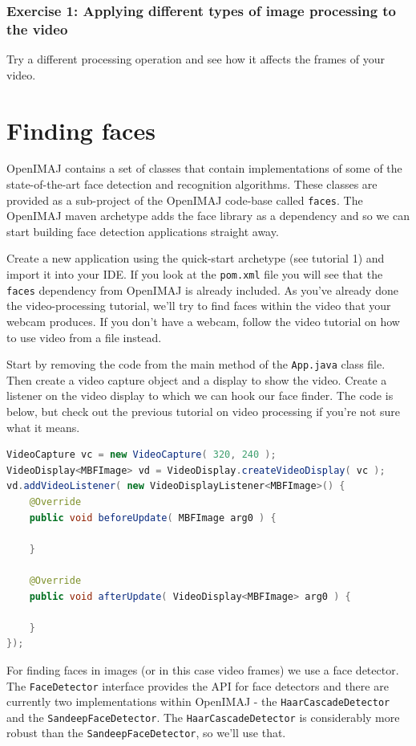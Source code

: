 \documentclass[10pt,a4paper,twoside,extrafontsizes]{memoir}
\begin{document}
\subsection*{Exercise 1: Applying different types of image processing to the video}
Try a different processing operation and see how it affects the frames of your video.

\chapter{Finding faces}
OpenIMAJ contains a set of classes that contain implementations of some of the state-of-the-art face 
detection and recognition algorithms. These classes are provided as a sub-project of the OpenIMAJ 
code-base called \verb+faces+. The OpenIMAJ maven archetype adds the face library as a dependency and 
so we can start building face detection applications straight away.

Create a new application using the quick-start archetype (see tutorial 1) and import it into your IDE. 
If you look at the \verb+pom.xml+ file you will see that the \verb+faces+ dependency from OpenIMAJ is 
already included. As you've already done the video-processing tutorial, we'll try to find faces within 
the video that your webcam produces. If you don't have a webcam, follow the video tutorial on how to 
use video from a file instead.

Start by removing the code from the main method of the \verb+App.java+ class file. Then create a video 
capture object and a display to show the video. Create a listener on the video display to which we can 
hook our face finder. The code is below, but check out the previous tutorial on video processing if 
you're not sure what it means.
\begin{lstlisting}[language=java]
VideoCapture vc = new VideoCapture( 320, 240 );
VideoDisplay<MBFImage> vd = VideoDisplay.createVideoDisplay( vc );
vd.addVideoListener( new VideoDisplayListener<MBFImage>() {
    @Override
    public void beforeUpdate( MBFImage arg0 ) {

    }

    @Override
    public void afterUpdate( VideoDisplay<MBFImage> arg0 ) {

    }
});
\end{lstlisting}
For finding faces in images (or in this case video frames) we use a face detector. The \verb+FaceDetector+ 
interface provides the API for face detectors and there are currently two implementations within OpenIMAJ - 
the \verb+HaarCascadeDetector+ and the \verb+SandeepFaceDetector+. The \verb+HaarCascadeDetector+
is considerably more robust than the \verb+SandeepFaceDetector+, so we'll use that.
\end{document}
